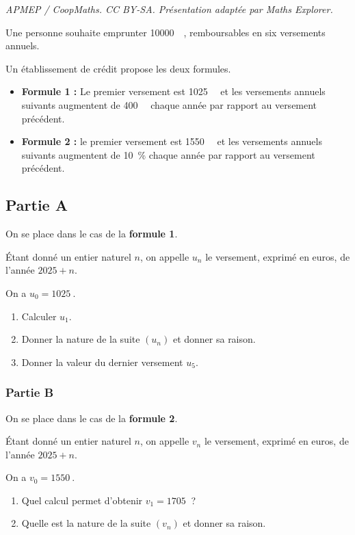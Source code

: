 \documentclass[10pt]{article}
\providecommand{\euro}{\texteuro}
\providecommand{\np}[2][]{{#2~#1}}
\providecommand{\euro}{{\text{€}}}
\renewcommand{\euro}{\ifmmode\text{\texteuro}\else\texteuro\fi}
\begin{document}
\noindent\textit{APMEP / CoopMaths. CC BY-SA. Présentation adaptée par Maths Explorer.}\par\medskip
Une personne souhaite emprunter \np{10000}~\euro{}, remboursables en six versements annuels.

Un établissement de crédit propose les deux formules.

\begin{itemize}[label={\textbullet}]
\item \textbf{Formule 1 :} Le premier versement est \np{1025}~\euro{} et les versements annuels suivants augmentent de \np{400}~\euro{} chaque année par rapport au versement précédent.
\item \textbf{Formule 2 :} le premier versement est \np{1550}~\euro{} et les versements annuels suivants augmentent de 10~\% chaque année par rapport au versement précédent.
\end{itemize}

\subsection*{Partie A}

On se place dans le cas de la \textbf{formule 1}.

Étant donné un entier naturel $n$, on appelle $u_n$ le versement, exprimé en euros, de l'année $2025+n$.

On a \quad $u_0=\np{1025}$.

\begin{enumerate}
\item Calculer $u_1$.
\item Donner la nature de la suite $(u_n)$ et donner sa raison.
\item Donner la valeur du dernier versement $u_5$.
\end{enumerate}

\subsubsection*{Partie B}

On se place dans le cas de la \textbf{formule 2}.

Étant donné un entier naturel $n$, on appelle $v_n$ le versement, exprimé en euros, de l'année $2025+n$.

On a \quad $v_0=\np{1550}$.

\begin{enumerate}
\item Quel calcul permet d'obtenir $v_1=\np{1705}$ ?
\item Quelle est la nature de la suite $(v_n)$ et donner sa raison.
\end{enumerate}
\end{document}
